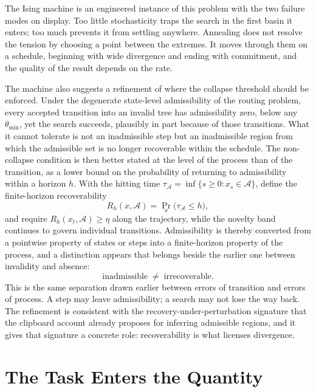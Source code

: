 \documentclass[11pt]{article}
\theoremstyle{definition}
\theoremstyle{remark}
\newcommand{\A}{\mathcal{A}}
\begin{document}
The Ising machine is an engineered instance of this problem with the two failure modes on display. Too little stochasticity traps the search in the first basin it enters; too much prevents it from settling anywhere. Annealing does not resolve the tension by choosing a point between the extremes. It moves through them on a schedule, beginning with wide divergence and ending with commitment, and the quality of the result depends on the rate.

The machine also suggests a refinement of where the collapse threshold should be enforced. Under the degenerate state-level admissibility of the routing problem, every accepted transition into an invalid tree has admissibility zero, below any $\theta_{\min}$, yet the search succeeds, plausibly in part because of those transitions. What it cannot tolerate is not an inadmissible step but an inadmissible region from which the admissible set is no longer recoverable within the schedule. The non-collapse condition is then better stated at the level of the process than of the transition, as a lower bound on the probability of returning to admissibility within a horizon $h$. With the hitting time $\tau_\A = \inf\{s \geq 0 : x_s \in \A\}$, define the finite-horizon recoverability
\begin{equation}
R_h(x, \A) = \Pr_x\big(\tau_\A \leq h\big),
\end{equation}
and require $R_h(x_t, \A) \geq \eta$ along the trajectory, while the novelty band continues to govern individual transitions. Admissibility is thereby converted from a pointwise property of states or steps into a finite-horizon property of the process, and a distinction appears that belongs beside the earlier one between invalidity and absence:
\begin{equation}
\boxed{\text{inadmissible} \;\neq\; \text{irrecoverable}.}
\end{equation} This is the same separation drawn earlier between errors of transition and errors of process. A step may leave admissibility; a search may not lose the way back. The refinement is consistent with the recovery-under-perturbation signature that the clipboard account already proposes for inferring admissible regions, and it gives that signature a concrete role: recoverability is what licenses divergence.

\section{The Task Enters the Quantity}
\end{document}
